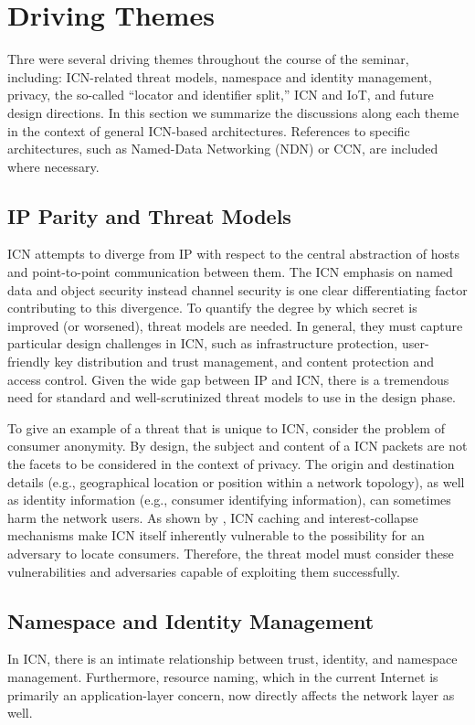 \section{Driving Themes} \label{sec:themes}
Thre were several driving themes throughout the course of the seminar, including:
ICN-related threat models, namespace and identity management, privacy, the
so-called ``locator and identifier split,'' ICN and IoT, and future design directions.
In this section we summarize the discussions along each theme in the context
of general ICN-based architectures. References to specific architectures, such as
Named-Data Networking (NDN) or CCN, are included where necessary.

\subsection{IP Parity and Threat Models}
ICN attempts to diverge from IP with respect
to the central abstraction of hosts and point-to-point communication between
them. The ICN emphasis on named data and object security instead channel security
is one clear differentiating factor contributing to this divergence. To quantify
the degree by which secret is improved (or worsened), threat models are needed.
In general, they must capture particular design challenges in ICN, such as
infrastructure protection, user-friendly key distribution and trust management, and
content protection and access control.  Given the wide gap between IP and ICN,
there is a tremendous need for standard and well-scrutinized threat models to use in the design phase.

To give an example of a threat that is unique to ICN, consider the
problem of consumer anonymity. By design, the subject and content
of a ICN packets are not the facets to be considered in the context of privacy.
The origin and destination details (e.g., geographical location or position within a network
topology), as well as identity information (e.g., consumer identifying information),
can sometimes harm the network users. As shown by \cite{compagno2015violating}, ICN caching and
interest-collapse mechanisms make ICN itself inherently vulnerable to the possibility for an
adversary to locate consumers. Therefore, the threat model must consider these vulnerabilities
and adversaries capable of exploiting them successfully.

\subsection{Namespace and Identity Management}
In ICN, there is an intimate relationship between trust, identity, and namespace management.
Furthermore, resource naming, which in the current Internet is primarily an application-layer
concern, now directly affects the network layer as well.


